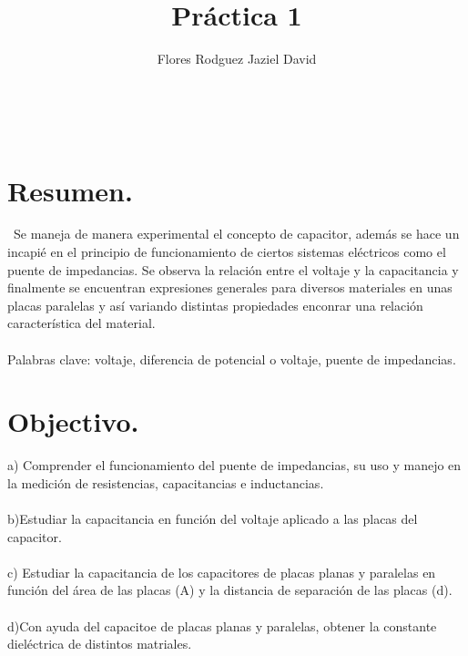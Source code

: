 \documentclass[11pt,a4paper]{article}
\author{Flores Rodguez Jaziel David }
\title{Práctica 1}
\begin{document}
\tableofcontents
\\
\medskip
\medskip
\section{Resumen.}
\
Se maneja de manera experimental el concepto de capacitor, adem\'{a}s se hace un incapi\'{e} en el principio de funcionamiento de ciertos sistemas el\'{e}ctricos como el puente de impedancias. Se observa la relaci\'{o}n entre el voltaje y la capacitancia y finalmente se encuentran expresiones generales para diversos materiales en unas placas paralelas y as\'{i} variando distintas propiedades enconrar una relaci\'{o}n caracter\'{i}stica del material.\\
\\
\medskip
Palabras clave: voltaje, diferencia de potencial o voltaje, puente de impedancias.


\section{Objectivo.}
a) Comprender el funcionamiento del puente de impedancias, su uso y manejo en la medici\'{o}n de resistencias, capacitancias e inductancias.
\\
\\
b)Estudiar la capacitancia en funci\'{o}n del voltaje aplicado a las placas del capacitor.
\\
\\
c) Estudiar la capacitancia de los capacitores de placas planas y paralelas en funci\'{o}n del \'{a}rea de las placas (A) y la distancia de separaci\'{o}n de las placas (d).
\\
\\
d)Con ayuda del capacitoe de placas planas y paralelas, obtener la constante diel\'{e}ctrica de distintos matriales.
\pagebreak


\end{document}
